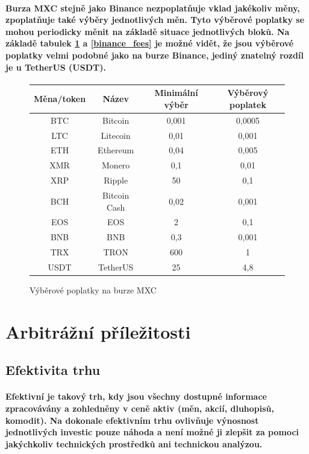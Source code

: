 \documentclass[thesis=B,czech]{FITthesis}[2019/03/21]
\begin{document}
\paragraph{
Burza MXC stejně jako Binance nezpoplatňuje vklad jakékoliv měny, zpoplatňuje také výběry jednotlivých měn. Tyto výběrové poplatky se mohou periodicky měnit na základě situace jednotlivých bloků. \cite{mxc_fees} Na základě tabulek \ref{mxc_fees} a \ref{binance_fees} je možné vidět, že jsou výběrové poplatky velmi podobné jako na burze Binance, jediný znatelný rozdíl je u TetherUS (USDT). \cite{cryptowisser_mxc}
}
\begin{figure}\centering
    \begin{center}
     \begin{tabular}{||c | c | c | c||} 
     \hline
     Měna/token & Název & Minimální výběr & Výběrový poplatek \\ [0.5ex] 
     \hline\hline
     BTC & Bitcoin & 0,001 & 0,0005 \\ 
     \hline
     LTC & Litecoin & 0,01 & 0,001 \\
     \hline
     ETH & Ethereum & 0,04 & 0,005 \\
     \hline
     XMR & Monero & 0,1 & 0,01 \\
     \hline
     XRP & Ripple & 50 & 0,1 \\
     \hline
     BCH & Bitcoin Cash & 0,02 & 0,001 \\
     \hline
     EOS & EOS & 2 & 0,1 \\
     \hline
     BNB & BNB & 0,3 & 0,001 \\
     \hline
     TRX & TRON & 600 & 1 \\
     \hline
     USDT & TetherUS & 25 & 4,8 \\ [1ex] 
     \hline
    \end{tabular}
    \end{center}
    \caption{Výběrové poplatky na burze MXC \cite{mxc_fees}}
    \label{mxc_fees}
\end{figure}
\section{Arbitrážní příležitosti}
\subsection{Efektivita trhu}
\paragraph{
Efektivní je takový trh, kdy jsou všechny dostupné informace zpracovávány a zohledněny v ceně aktiv (měn, akcií, dluhopisů, komodit). Na dokonale efektivním trhu ovlivňuje výnosnost jednotlivých investic pouze náhoda a není možné ji zlepšit za pomoci jakýchkoliv technických prostředků ani technickou analýzou. \cite{efektivita_trhu}
}
\end{document}
